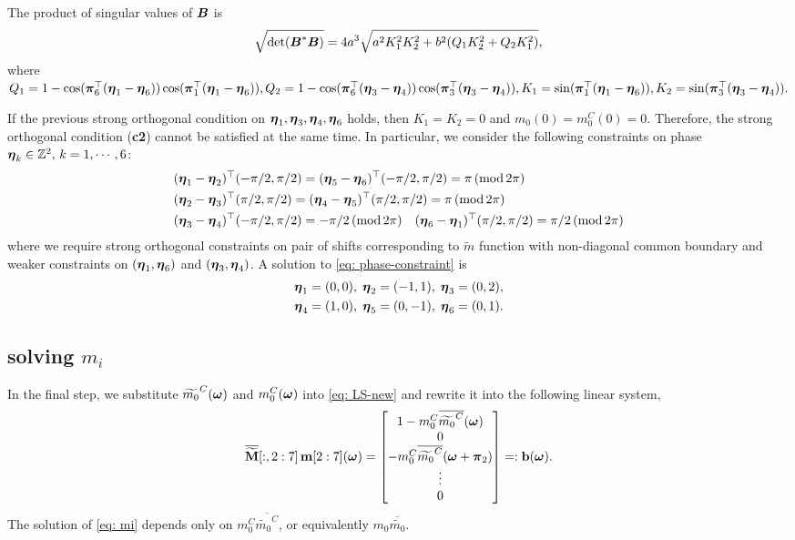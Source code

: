The product of singular values of $\boldsymbol{B}$ is 
\begin{align}\label{eq: detB}
\sqrt{\text{det}(\boldsymbol{B}^* \boldsymbol{B})} = 4a^3\sqrt{a^2 K_1^2K_2^2 + b^2(Q_1K_2^2 + Q_2K_1^2)},
\end{align}
where $ Q_1 = 1 - \cos(\boldsymbol{\pi}_6^\top(\boldsymbol{\eta}_1-\boldsymbol{\eta}_6))\cos(\boldsymbol{\pi}_1^\top(\boldsymbol{\eta}_1-\boldsymbol{\eta}_6)), Q_2 = 1 - \cos(\boldsymbol{\pi}_6^\top(\boldsymbol{\eta}_3-\boldsymbol{\eta}_4))\cos(\boldsymbol{\pi}_3^\top(\boldsymbol{\eta}_3-\boldsymbol{\eta}_4)), K_1 = \sin(\boldsymbol{\pi}_1^\top(\boldsymbol{\eta}_1-\boldsymbol{\eta}_6)), K_2 = \sin(\boldsymbol{\pi}_3^\top(\boldsymbol{\eta}_3-\boldsymbol{\eta}_4)).$

 If the previous strong orthogonal condition on $\boldsymbol{\eta}_1, \boldsymbol{\eta}_3, \boldsymbol{\eta}_4,\boldsymbol{\eta}_6$ holds, then $K_1 = K_2 = 0$ and $m_0(0)=m_0^C(0)= 0$. Therefore, the strong orthogonal condition ({\bf c2}) cannot be satisfied at the same time. 
In particular, we consider the following constraints on phase $\boldsymbol{\eta}_k\in \mathbb{Z}^2,\, k = 1,\cdots,6$:
\begin{align}
\label{eq: phase-constraint}
&(\boldsymbol{\eta}_1-\boldsymbol{\eta}_2)^\top(-\pi/2, \pi/2) = (\boldsymbol{\eta}_5-\boldsymbol{\eta}_6)^\top(-\pi/2,\pi/2) = \pi\, (\text{mod}\, 2\pi)\notag\\
&(\boldsymbol{\eta}_2-\boldsymbol{\eta}_3)^\top(\pi/2,\pi/2) = (\boldsymbol{\eta}_4-\boldsymbol{\eta}_5)^\top(\pi/2,\pi/2) = \pi\, (\text{mod}\, 2\pi)\\
&(\boldsymbol{\eta}_3-\boldsymbol{\eta}_4)^\top(-\pi/2, \pi/2) =-\pi/2\,(\text{mod}\,2\pi)\quad (\boldsymbol{\eta}_6 - \boldsymbol{\eta}_1)^\top(\pi/2,\pi/2) = \pi/2\, (\text{mod}\,2\pi) \notag
\end{align}
where we require strong orthogonal constraints on pair of shifts corresponding to $\widetilde{m}$ function with non-diagonal common boundary and weaker constraints on $(\boldsymbol{\eta}_1,\boldsymbol{\eta}_6)$ and $(\boldsymbol{\eta}_3,\boldsymbol{\eta}_4)$. A solution to \eqref{eq: phase-constraint} is 
\begin{align}\label{eq: phase-sol}
\boldsymbol{\eta}_1 = (0,0),\; \boldsymbol{\eta}_2 = (-1,1),\; \boldsymbol{\eta}_3 = (0,2),\notag\\
\boldsymbol{\eta}_4 = (1,0),\; \boldsymbol{\eta}_5 = (0,-1),\; \boldsymbol{\eta}_6 = (0,1).
\end{align}

\subsection{solving $m_i$}
In the final step, we substitute $\widetilde{m_{0}}^C(\boldsymbol{\omega})$ and $m_0^C(\boldsymbol{\omega})$ into \eqref{eq: LS-new} and rewrite it into the following linear system,
\begin{align}\label{eq: mi}
\overline{\widetilde{\mathbf{M}}}[:,2:7]\,\mathbf{m}[2:7](\boldsymbol{\omega}) = 
\begin{bmatrix}
1-m_0^C\overline{\widetilde{m_0}^C}(\boldsymbol{\omega})\\
0\\
-m_0^C\overline{\widetilde{m_0}^C}(\boldsymbol{\omega}+\boldsymbol{\pi}_2)\\
\vdots \\
0
\end{bmatrix}
=:\mathbf{b}(\boldsymbol{\omega}).
\end{align}
The solution of \eqref{eq: mi} depends only on $m_0^C\overline{\widetilde{m_0}^C}$, or equivalently $m_0\overline{\widetilde{m_0}}$. 


